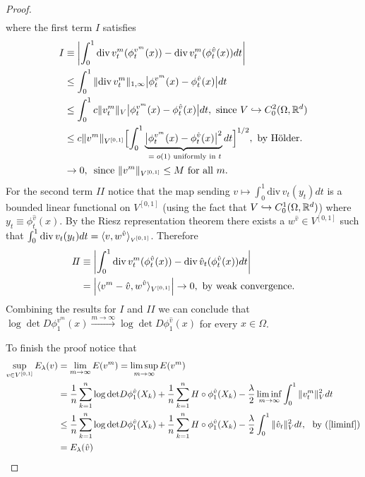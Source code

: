 \documentclass[noinfoline]{imsart}
\begin{document}
\begin{proof}
\begin{align*}
\end{align*}
where the first term $I$ satisfies 
\begin{align*}
I &\equiv \left| \int_{0}^1 \text{div}\, v^m_t(\phi_t^{v^m}(x)) -  \text{div}\, v^m_t(\phi_t^{\hat v}(x)) dt \right| \\
&\leq \int_{0}^1 \|\text{div}\, v^m_t\|_{1,\infty} \bigl|\phi_t^{v^m}(x) -  \phi_t^{\hat v}(x)\bigr| dt  \\
&\leq   \int_{0}^1 c\| v^m_t\|_{V} \bigl|\phi_t^{v^m}(x) -  \phi_t^{\hat v}(x)\bigr| dt,\,\,\text{since $V\hookrightarrow C_0^2(\Omega,\Bbb R^d)$} \\
&\leq  c\|  v^m\|_{V^{[0,1]}} \Bigl[\int_{0}^1 \underbrace{\bigl|\phi_t^{v^m}(x) -  \phi_t^{\hat v}(x)\bigr|^2}_\text{ $= o(1)$ uniformly in $t$} dt\Bigr]^{1/2},\,\,\text{by H\"older.} \\
&\rightarrow 0,\,\text{ since $\| v^m\|_{V^{[0,1]}}\leq M$ for all $m$.}
\end{align*}
For the second term $I\!I$ notice that  the map sending $v\mapsto \int_0^1 \text{div}\, v_t(y_t) dt$ is a bounded linear functional on $V^{[0,1]}$ (using the fact that $V\hookrightarrow C_0^1(\Omega, \Bbb R^d)$) where $y_t \equiv \phi_t^{\hat v}(x)$. By the Riesz representation theorem there exists a $w^{\hat v}\in V^{[0,1]}$ such that $\int_0^1 \text{div}\, v_t(y_t) dt = \langle v,w^{\hat v} \rangle_\text{\tiny $V^{[0,1]}$}$. Therefore  %
 \begin{align*} 
I\!I 
&\equiv \left| \int_{0}^1 \text{div}\, v_t^m(\phi_t^{\hat v}(x)) -  \text{div}\, \hat v_t(\phi_t^{\hat v}(x)) dt \right|\\
&=   \Bigl| \langle v^m -  \hat v, w^{\hat v}\rangle_{V^{[0,1]}}\Bigr|\rightarrow 0, \,\,\text{by weak convergence.}
\end{align*}
Combining the results for $I$ and $I\!I$ we can conclude that $\log \det D\phi_1^{v^m}(x)\overset{m\rightarrow\infty}\longrightarrow \log \det D\phi_1^{\hat v}(x)$ for every $x\in \Omega$.

To finish the proof notice that
\begin{align}
\sup_{v\in V^{[0,1]}} E_\lambda(v) &= \lim_{m\rightarrow \infty} E(v^m)= \limsup_{m\rightarrow \infty} E(v^m)\nonumber\\
&= \frac{1}{n}\sum_{k=1}^n   \log\text{det} D\phi_1^{\hat v}(X_k)+ \frac{1}{n}\sum_{k=1}^n H\circ\phi_1^{\hat v}(X_k) -\frac{\lambda}{2} \liminf_{m\rightarrow \infty} \int_0^1 \| v^m_t \|_V^2 dt \nonumber\\
&\leq \frac{1}{n}\sum_{k=1}^n   \log\text{det} D\phi_1^{\hat v}(X_k)+ \frac{1}{n}\sum_{k=1}^n H\circ\phi_1^{\hat v}(X_k) -\frac{\lambda}{2}  \int_0^1 \| \hat v_t \|_V^2 dt,\,\,\text{ by (\ref{liminf})}\nonumber \\
&= E_\lambda(\hat v) \nonumber
\end{align}

  \end{proof}
\end{document}
